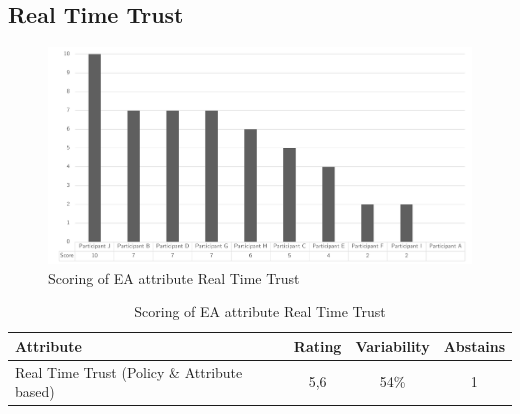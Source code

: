 \subsection{Real Time Trust}
\begin{figure}[H]
	\centering
	\includegraphics[width=0.9\linewidth]{images/scoreearealtimetrust}
	\caption[Scoring of EA attribute Real Time Trust]{Scoring of EA attribute Real Time Trust}
	\label{fig:appscoringearealtimetrust}
\end{figure}
\begin{table}[H]
	\centering
	\begin{tabular}{p{}ccc}
		\toprule
		\textbf{Attribute} & \textbf{Rating} & \textbf{Variability} & \textbf{Abstains} \\
		\midrule
		Real Time Trust (Policy \& Attribute based) & 5,6 & 54\% & 1 \\%
		\bottomrule
	\end{tabular}%
	\caption[Scoring of EA attribute Real Time Trust]{Scoring of EA attribute Real Time Trust}
	\label{tab:appscoringearealtimetrust}%
\end{table}%
\newpage

